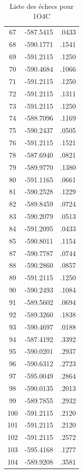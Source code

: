 \documentclass[a4paper,12pt]{article}
\begin{document}
\begin{table}[h]
\begin{tabular}{|c|c|c|}
        67 & -587.5415 & .0433 \\
        68 & -590.1771 & .1541 \\
        69 & -591.2115 & .1250 \\
        70 & -590.4684 & .1066 \\
        71 & -591.2115 & .1250 \\
        72 & -591.2115 & .1311 \\
        73 & -591.2115 & .1250 \\
        74 & -588.7096 & .1169 \\
        75 & -590.2437 & .0505 \\
        76 & -591.2115 & .1521 \\
        78 & -587.6940 & .0821 \\
        79 & -589.9770 & .1380 \\
        80 & -591.1165 & .0661 \\
        81 & -590.2528 & .1229 \\
        82 & -589.8459 & .0724 \\
        83 & -590.2079 & .0513 \\
        84 & -591.2095 & .0433 \\
        85 & -590.8011 & .1154 \\
        87 & -590.7787 & .0744 \\
        88 & -590.2860 & .0857 \\
        89 & -591.2115 & .1250 \\
        90 & -590.2493 & .1084 \\
        91 & -589.5602 & .0694 \\
        92 & -589.3260 & .1838 \\
        93 & -590.4697 & .0188 \\
        94 & -587.4192 & .3392 \\
        95 & -590.0201 & .2937 \\
        96 & -590.6312 & .2723 \\
        97 & -595.0049 & .2864 \\
        98 & -590.0135 & .2013 \\
        99 & -589.7855 & .2932 \\
        100 & -591.2115 & .2120 \\
        101 & -591.2115 & .2120 \\
        102 & -591.2115 & .2572 \\
        103 & -595.4168 & .1277 \\
        104 & -589.9208 & .3581 \\
        
        \hline


      \end{tabular}      
      \caption{Liste des échecs pour 1O4C}
      \label{tab_echec1O4C__1}      
    \end{table}
\end{document}
